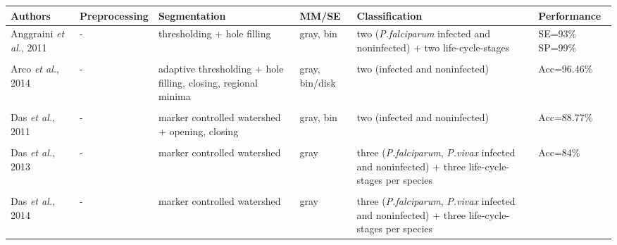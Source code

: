 \footnotesize
{}
    \begin{longtable}{C{2.1cm} C{2.7cm} C{2.2cm} C{2.0cm} C{2.7cm} C{2.0cm} }

		\hline
    	\textbf{Authors} & \textbf{Preprocessing} & \textbf{Segmentation} & \textbf{MM/SE} & \textbf{Classification} & \textbf{Performance}  \\[1pt] \hline

    Anggraini \emph{et al.}, 2011 &
		- &
		thresholding + hole filling &	
		gray, bin &
		two (\emph{P.falciparum} infected and noninfected) + two life-cycle-stages &
		SE=93\% SP=99\%
		\\
&   &  &  &  & \\
    Arco \emph{et al.}, 2014 &
		- &
		adaptive thresholding + hole filling, closing, regional minima &	
		gray, bin/disk &
		two (infected and noninfected) &
		Acc=96.46\%
        \\
        &   &  &  &  & \\
    Das \emph{et al.}, 2011 &
		- &
		marker controlled watershed + opening, closing &	
		gray, bin  &
		two (infected and noninfected) &
		Acc=88.77\%
        \\
        &   &  &  &  & \\
    Das \emph{et al.}, 2013 &
		- &
		marker controlled watershed &	
		gray &
	three (\emph{P.falciparum}, \emph{P.vivax} infected and noninfected) + three life-cycle-stages per species &
		Acc=84\%
        \\
&   &  &  &  & \\
    Das \emph{et al.}, 2014 &
		- &
		marker controlled watershed &	
		gray &
	three (\emph{P.falciparum}, \emph{P.vivax} infected and noninfected) + three life-cycle-stages per species &

\end{longtable}
